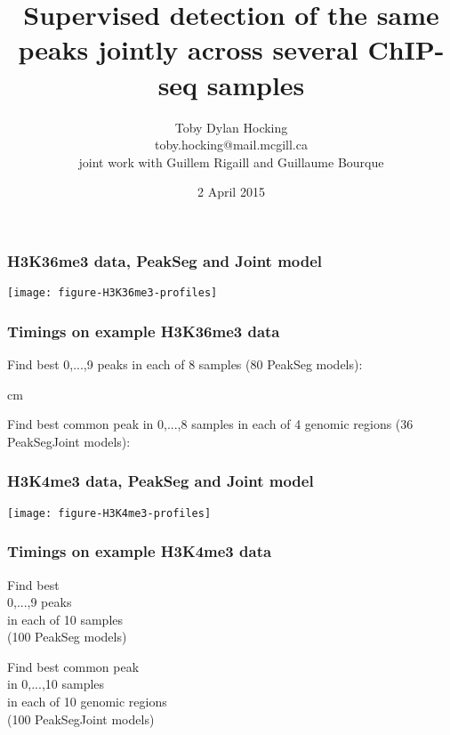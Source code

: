 \documentclass{beamer}
\begin{document}
\title{Supervised detection of the same peaks jointly across 
  several ChIP-seq samples}

\author{
  Toby Dylan Hocking\\
  toby.hocking@mail.mcgill.ca\\
  joint work with Guillem Rigaill and Guillaume Bourque}

\date{2 April 2015}

\maketitle



\begin{frame}
  \frametitle{H3K36me3 data, PeakSeg and Joint model}

  \texttt{[image: figure-H3K36me3-profiles]}
\end{frame}

\begin{frame}
  \frametitle{Timings on example H3K36me3 data}

  \small

  Find best 0,...,9 peaks in each of 8 samples (80 PeakSeg
  models):

  

   cm

  Find best common peak in 0,...,8 samples in each of 4 genomic
  regions (36 PeakSegJoint models):

  

\end{frame}

\begin{frame}
  \frametitle{H3K4me3 data, PeakSeg and Joint model}

  \texttt{[image: figure-H3K4me3-profiles]}
\end{frame}

\begin{frame}
  \frametitle{Timings on example H3K4me3 data}

  \small

\parbox{1.5in}{
  Find best \\
  0,...,9 peaks\\
  in each of 10 samples\\
  (100 PeakSeg models)

  
}
\parbox{2in}{
  Find best common peak\\
  in 0,...,10 samples\\
  in each of 10 genomic regions\\
  (100 PeakSegJoint models)

  
}

\end{frame}
\end{document}
